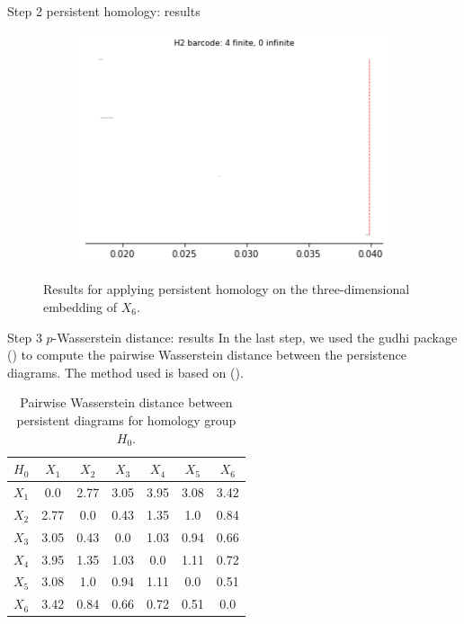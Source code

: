\documentclass[xcolor={dvipsnames,svgnames}]{beamer}
\begin{document}
\begin{frame}{Step 2 persistent homology: results}
\begin{figure}[H]
\begin{subfigure}[b]{0.2\textwidth}
\includegraphics[width=\textwidth]{figures/X6_H2_barcode.png}
 \caption{}
\end{subfigure}
\caption{Results for applying persistent homology on the three-dimensional embedding of $X_6$.}
\end{figure}
\end{frame}

\begin{frame}{Step 3 $p$-Wasserstein distance: results}
In the last step, we used the gudhi package (\cite{gudhi:urm}) to compute the pairwise Wasserstein distance between the persistence diagrams. The method used is based on (\cite{kerber_geometry_2016}). 
\begin{table}[!htbp]
        \centering
        \small
        \setlength\tabcolsep{5pt}
        \begin{tabular}{|c|c|c|c|c|c|c|}
\hline
 $H_0$& $X_1$ & $X_2$ & $X_3$ & $X_4$ & $X_5$ & $X_6$\\
 \hline
$X_1$ &
0.0&
2.77&
3.05&
3.95&
3.08&
3.42
\\
\hline
$X_2$ &
2.77&
0.0&
0.43&
1.35&
1.0&
0.84
\\
\hline
$X_3$ &
3.05&
0.43&
0.0&
1.03&
0.94&
0.66
\\
\hline
$X_4$ &
3.95&
1.35&
1.03&
0.0&
1.11&
0.72
\\
\hline
$X_5$ &
3.08&
1.0&
0.94&
1.11&
0.0&
0.51
\\
\hline
$X_6$ &
3.42&
0.84&
0.66&
0.72&
0.51&
0.0
\\
\hline
\end{tabular}
\caption{Pairwise Wasserstein distance between persistent diagrams for homology group $H_0$.}
\label{tab:Wass_H0}
\end{table}
\end{frame}
\end{document}
